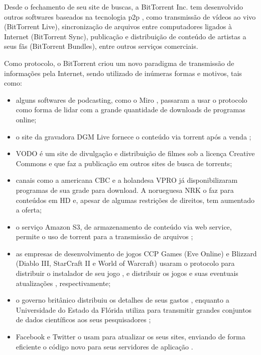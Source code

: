 Desde o fechamento de seu site de buscas, a BitTorrent Inc. tem desenvolvido outros
softwares baseados na tecnologia \gls*{p2p} \cite{site:bittorrent}, como transmissão de
vídeos ao vivo (BitTorrent Live), sincronização de arquivos entre computadores ligados
à Internet (BitTorrent Sync), publicação e distribuição de conteúdo de artistas a seus
fãs (BitTorrent Bundles), entre outros serviços comerciais.

Como protocolo, o BitTorrent criou um novo paradigma de transmissão de informações pela
Internet, sendo utilizado de inúmeras formas e motivos, tais como:

\begin{itemize}
    \item alguns softwares de podcasting, como o Miro \cite{site:miro}, passaram a
        usar o protocolo como forma de lidar com a grande quantidade de downloads de
        programas online;

    \item o site da gravadora DGM Live fornece o conteúdo via torrent após a venda
        \cite{site:dgm};

    \item VODO \cite{site:vodo} é um site de divulgação e distribuição de filmes sob a
        licença Creative Commons e que faz a publicação em outros sites de busca de
        torrents;

    \item canais como a americana CBC \cite{site:cbc} e a holandesa VPRO
        \cite{site:vpro} já disponibilizaram programas de sua grade para download. A
        norueguesa NRK o faz para conteúdos em HD \cite{site:nrk} e, apesar de algumas
        restrições de direitos, tem aumentado a oferta;

    \item o serviço Amazon S3, de armazenamento de conteúdo via web service, permite o
        uso de torrent para a transmissão de arquivos \cite{site:aws-s3};

    \item as empresas de desenvolvimento de jogos CCP Games (Eve Online) e Blizzard
        (Diablo III, StarCraft II e World of Warcraft) usaram o protocolo para
        distribuir o instalador de seu jogo \cite{site:eve}, e distribuir os jogos e
        suas eventuais atualizações \cite{site:blizzard}, respectivamente;

    \item o governo britânico distribuiu os detalhes de seus gastos \cite{site:gov-uk},
        enquanto a Universidade do Estado da Flórida utiliza para transmitir grandes
        conjuntos de dados científicos aos seus pesquisadores \cite{site:univ-fl};

    \item Facebook \cite{site:facebook-torrent} e Twitter \cite{site:twitter-torrent}
        o usam para atualizar os seus sites, enviando de forma eficiente o código novo
        para seus servidores de aplicação \cite{site:twitter-torrent-power}.
\end{itemize}

